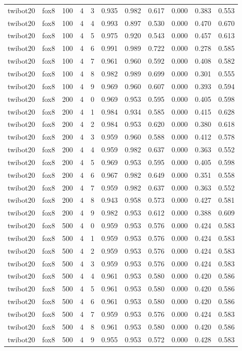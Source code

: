 \begin{tabular}{llrrrrrrrrr}
twibot20 & fox8 & 100 & 4 & 3 & 0.935 & 0.982 & 0.617 & 0.000 & 0.383 & 0.553 \\
twibot20 & fox8 & 100 & 4 & 4 & 0.993 & 0.897 & 0.530 & 0.000 & 0.470 & 0.670 \\
twibot20 & fox8 & 100 & 4 & 5 & 0.975 & 0.920 & 0.543 & 0.000 & 0.457 & 0.613 \\
twibot20 & fox8 & 100 & 4 & 6 & 0.991 & 0.989 & 0.722 & 0.000 & 0.278 & 0.585 \\
twibot20 & fox8 & 100 & 4 & 7 & 0.961 & 0.960 & 0.592 & 0.000 & 0.408 & 0.582 \\
twibot20 & fox8 & 100 & 4 & 8 & 0.982 & 0.989 & 0.699 & 0.000 & 0.301 & 0.555 \\
twibot20 & fox8 & 100 & 4 & 9 & 0.969 & 0.960 & 0.607 & 0.000 & 0.393 & 0.594 \\
twibot20 & fox8 & 200 & 4 & 0 & 0.969 & 0.953 & 0.595 & 0.000 & 0.405 & 0.598 \\
twibot20 & fox8 & 200 & 4 & 1 & 0.984 & 0.934 & 0.585 & 0.000 & 0.415 & 0.628 \\
twibot20 & fox8 & 200 & 4 & 2 & 0.984 & 0.953 & 0.620 & 0.000 & 0.380 & 0.618 \\
twibot20 & fox8 & 200 & 4 & 3 & 0.959 & 0.960 & 0.588 & 0.000 & 0.412 & 0.578 \\
twibot20 & fox8 & 200 & 4 & 4 & 0.959 & 0.982 & 0.637 & 0.000 & 0.363 & 0.552 \\
twibot20 & fox8 & 200 & 4 & 5 & 0.969 & 0.953 & 0.595 & 0.000 & 0.405 & 0.598 \\
twibot20 & fox8 & 200 & 4 & 6 & 0.967 & 0.982 & 0.649 & 0.000 & 0.351 & 0.558 \\
twibot20 & fox8 & 200 & 4 & 7 & 0.959 & 0.982 & 0.637 & 0.000 & 0.363 & 0.552 \\
twibot20 & fox8 & 200 & 4 & 8 & 0.943 & 0.958 & 0.573 & 0.000 & 0.427 & 0.581 \\
twibot20 & fox8 & 200 & 4 & 9 & 0.982 & 0.953 & 0.612 & 0.000 & 0.388 & 0.609 \\
twibot20 & fox8 & 500 & 4 & 0 & 0.959 & 0.953 & 0.576 & 0.000 & 0.424 & 0.583 \\
twibot20 & fox8 & 500 & 4 & 1 & 0.959 & 0.953 & 0.576 & 0.000 & 0.424 & 0.583 \\
twibot20 & fox8 & 500 & 4 & 2 & 0.959 & 0.953 & 0.576 & 0.000 & 0.424 & 0.583 \\
twibot20 & fox8 & 500 & 4 & 3 & 0.959 & 0.953 & 0.576 & 0.000 & 0.424 & 0.583 \\
twibot20 & fox8 & 500 & 4 & 4 & 0.961 & 0.953 & 0.580 & 0.000 & 0.420 & 0.586 \\
twibot20 & fox8 & 500 & 4 & 5 & 0.961 & 0.953 & 0.580 & 0.000 & 0.420 & 0.586 \\
twibot20 & fox8 & 500 & 4 & 6 & 0.961 & 0.953 & 0.580 & 0.000 & 0.420 & 0.586 \\
twibot20 & fox8 & 500 & 4 & 7 & 0.959 & 0.953 & 0.576 & 0.000 & 0.424 & 0.583 \\
twibot20 & fox8 & 500 & 4 & 8 & 0.961 & 0.953 & 0.580 & 0.000 & 0.420 & 0.586 \\
twibot20 & fox8 & 500 & 4 & 9 & 0.955 & 0.953 & 0.572 & 0.000 & 0.428 & 0.583 \\
\bottomrule
\end{tabular}
